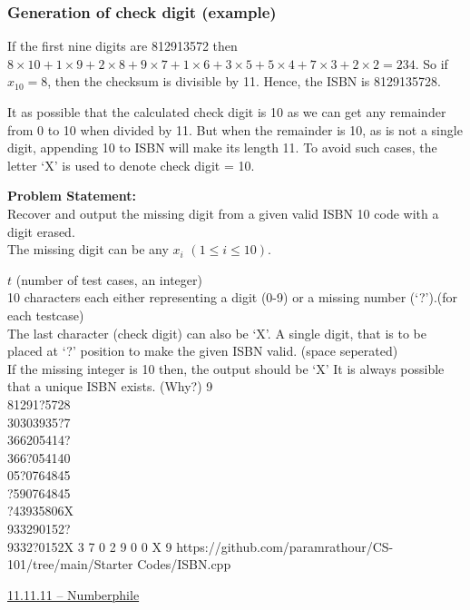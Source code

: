\documentclass[../../Problems]{subfiles}
\begin{document}
\subsubsection*{Generation of check digit (example)}
If the first nine digits are 812913572 then $8\times10 + 1\times9 + 2\times8 + 9\times7 + 1\times6 + 3\times5 + 5\times4 + 7\times3 + 2\times2 = 234$. So if $x_{10} = 8$, then the checksum is divisible by 11. Hence, the ISBN is 8129135728.
\begin{note}
It as possible that the calculated check digit is 10 as we can get any remainder from 0 to 10 when divided by 11. But when the remainder is 10, as is not a single digit, appending 10 to ISBN will make its length 11. To avoid such cases, the letter `X' is used to denote check digit = 10.
\end{note}
\textbf{Problem Statement:}\\
Recover and output the missing digit from a given valid ISBN 10 code with a digit erased.\\
The missing digit can be any $x_i$ $(1\leq i\leq 10)$.
\begin{testcases}
	{$t$ \hfill(number of test cases, an integer)\\
	10 characters each either representing a digit (0-9) or a missing number (‘?’).\hfill(for each testcase)\\
	The last character (check digit) can also be `X'.}
	{A single digit, that is to be placed at `?' position to make the given ISBN valid.
 \hfill{(space seperated)}\\
	If the missing integer is 10 then, the output should be `X'}
	{It is always possible that a unique ISBN exists. (Why?)}
	{9\\81291?5728\\30303935?7\\366205414?\\366?054140\\05?0764845\\?590764845\\?43935806X\\933290152?\\9332?0152X}
	{3 7 0 2 9 0 0 X 9}
	{https://github.com/paramrathour/CS-101/tree/main/Starter Codes/ISBN.cpp}
\end{testcases}
\begin{funvideo}
\href{https://youtu.be/sPFWfAxIiwg}{11.11.11 -- Numberphile}
\end{funvideo}
\end{document}
